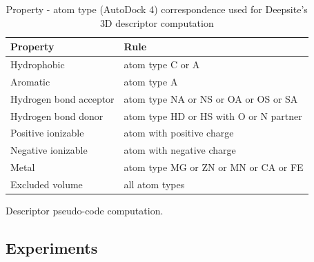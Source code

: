 \documentclass[10pt,a4paper,twoside]{book}
\begin{document}
\begin{table}[!htb]
\centering
\caption{Property - atom type (AutoDock 4) correspondence used for Deepsite's 3D descriptor computation}
\label{table:corr}
\begin{tabular}{@{}ll@{}}
\toprule
\textbf{Property}      & \textbf{Rule}                          \\ \midrule
Hydrophobic            & atom type C or A                       \\
Aromatic               & atom type A                            \\
Hydrogen bond acceptor & atom type NA or NS or OA or OS or SA   \\
Hydrogen bond donor    & atom type HD or HS with O or N partner \\
Positive ionizable     & atom with positive charge              \\
Negative ionizable     & atom with negative charge              \\
Metal                  & atom type MG or ZN or MN or CA or FE   \\
Excluded volume        & all atom types                         \\ \bottomrule
\end{tabular}
\end{table}

 
  	\begin{algorithm}
		\caption{Descriptor pseudo-code computation.}
		\label{alg}
		\begin{algorithmic}[1]
							\EndFor
					\EndFor
			\EndFor
			\EndFunction
		\end{algorithmic}
	\end{algorithm}


\subsection{Experiments}
\end{document}
